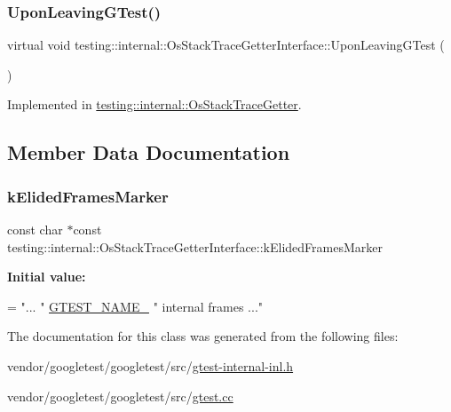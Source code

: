\subsubsection{\texorpdfstring{Upon\+Leaving\+G\+Test()}{UponLeavingGTest()}}
{\footnotesize\ttfamily virtual void testing\+::internal\+::\+Os\+Stack\+Trace\+Getter\+Interface\+::\+Upon\+Leaving\+G\+Test (\begin{DoxyParamCaption}{ }\end{DoxyParamCaption})\hspace{0.3cm}{\ttfamily [pure virtual]}}



Implemented in \hyperlink{classtesting_1_1internal_1_1_os_stack_trace_getter_a8ae0237629b6b5672b4b5ef8e292205c}{testing\+::internal\+::\+Os\+Stack\+Trace\+Getter}.



\subsection{Member Data Documentation}
\mbox{\label{classtesting_1_1internal_1_1_os_stack_trace_getter_interface_a669c49ce9ae05935e70bddb35a81ceb8}} 
\subsubsection{\texorpdfstring{k\+Elided\+Frames\+Marker}{kElidedFramesMarker}}
{\footnotesize\ttfamily const char $\ast$const testing\+::internal\+::\+Os\+Stack\+Trace\+Getter\+Interface\+::k\+Elided\+Frames\+Marker\hspace{0.3cm}{\ttfamily [static]}}

{\bfseries Initial value\+:}
\begin{DoxyCode}
=
    \textcolor{stringliteral}{"... "} \hyperlink{gtest-port_8h_a13d98c217176bd8722c395b9225fc19d}{GTEST\_NAME\_} \textcolor{stringliteral}{" internal frames ..."}
\end{DoxyCode}


The documentation for this class was generated from the following files\+:\begin{DoxyCompactItemize}
\item 
vendor/googletest/googletest/src/\hyperlink{gtest-internal-inl_8h}{gtest-\/internal-\/inl.\+h}\item 
vendor/googletest/googletest/src/\hyperlink{gtest_8cc}{gtest.\+cc}\end{DoxyCompactItemize}
